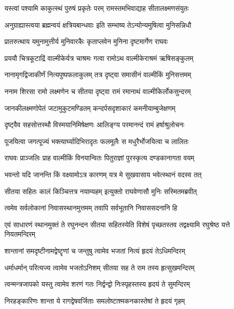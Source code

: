 \twolineshloka
{यस्त्वां पश्यामि काकुत्स्थं पुरुषं प्रकृतेः परम्}
{रामस्तमभिवाद्याह सीतालक्ष्मणसंयुतः} %

\twolineshloka
{अनुग्राह्यास्त्वया ब्रह्मन्वयं क्षत्रियबान्धवाः}
{इति सम्भाष्य तेऽन्योन्यमुषित्वा मुनिसन्निधौ} %

\twolineshloka
{प्रातरुत्थाय यमुनामुत्तीर्य मुनिवारकैः}
{कृताप्लवेन मुनिना दृष्टमार्गेण राघवः} %

\twolineshloka
{प्रययौ चित्रकूटाद्रिं वाल्मीकेर्यत्र चाश्रमः}
{गत्वा रामोऽथ वाल्मीकेराश्रमं ऋषिसङ्कुलम्} %

\twolineshloka
{नानामृगद्विजाकीर्णं नित्यपुष्पफलाकुलम्}
{तत्र दृष्ट्वा समासीनं वाल्मीकिं मुनिसत्तमम्} %

\twolineshloka
{ननाम शिरसा रामो लक्ष्मणेन च सीतया}
{दृष्ट्वा रामं रमानाथं वाल्मीकिर्लोकसुन्दरम्} %

\twolineshloka
{जानकीलक्ष्मणोपेतं जटामुकुटमण्डितम्}
{कन्दर्पसदृशाकारं कमनीयाम्बुजेक्षणम्} %

\twolineshloka
{दृष्ट्वैव सहसोत्तस्थौ विस्मयानिमिषेक्षणः}
{आलिङ्ग्य परमानन्दं रामं हर्षाश्रुलोचनः} %

\twolineshloka
{पूजयित्वा जगत्पूज्यं भक्त्यार्घ्यादिभिरादृतः}
{फलमूलैः स मधुरैर्भोजयित्वा च लालितः} %

\twolineshloka
{राघवः प्राञ्जलिः प्राह वाल्मीकिं विनयान्वितः}
{पितुराज्ञां पुरस्कृत्य दण्डकानागता वयम्} %

\twolineshloka
{भवन्तो यदि जानन्ति किं वक्ष्यामोऽत्र कारणम्}
{यत्र मे सुखवासाय भवेत्स्थानं वदस्व तत्} %

\twolineshloka
{सीतया सहितः कालं किञ्चित्तत्र नयाम्यहम्}
{इत्युक्तो राघवेणासौ मुनिः सस्मितमब्रवीत्} %

\twolineshloka
{त्वमेव सर्वलोकानां निवासस्थानमुत्तमम्}
{तवापि सर्वभूतानि निवाससदनानि हि} %

\threelineshloka
{एवं साधारणं स्थानमुक्तं ते रघुनन्दन}
{सीतया सहितस्येति विशेषं पृच्छतस्तव}
{तद्वक्ष्यामि रघुश्रेष्ठ यत्ते नियतमन्दिरम्} %

\twolineshloka
{शान्तानां समदृष्टीनामद्वेष्टॄणां च जन्तुषु}
{त्वामेव भजतां नित्यं हृदयं तेऽधिमन्दिरम्} %

\twolineshloka
{धर्माधर्मान् परित्यज्य त्वामेव भजतोऽनिशम्}
{सीतया सह ते राम तस्य हृत्सुखमन्दिरम्} %

\twolineshloka
{त्वन्मन्त्रजापको यस्तु त्वामेव शरणं गतः}
{निर्द्वन्द्वो निःस्पृहस्तस्य हृदयं ते सुमन्दिरम्} %

\twolineshloka
{निरहङ्कारिणः शान्ता ये रागद्वेषवर्जिताः}
{समलोष्टाश्मकनकास्तेषां ते हृदयं गृहम्} %

